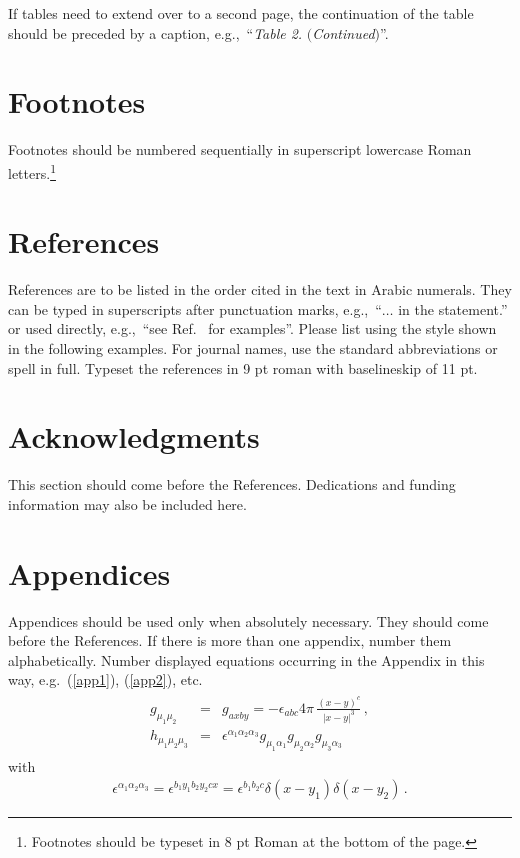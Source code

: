 \documentclass{ws-ijmpc}
\begin{document}
If tables need to extend over to a second page, the continuation of
the table should be preceded by a caption, e.g.,~``{\it Table 2.}
$(${\it Continued}$)$''.

\section{Footnotes}
Footnotes should be numbered sequentially in superscript
lowercase Roman letters.\footnote{Footnotes should be
typeset in 8 pt Roman at the bottom of the page.}

\section{References}
References are to be listed in the order cited in the text in Arabic
numerals.  They can be typed in superscripts after punctuation marks,
e.g.,~``$\ldots$ in the statement.\cite{1,2,3}'' or used directly,
e.g.,~``see Ref.~ for examples''. Please list using the
style shown in the following examples.  For journal names, use the
standard abbreviations or spell in full. Typeset the references in 9 pt
roman with baselineskip of 11 pt.

\section*{Acknowledgments}
This section should come before the References. Dedications and
funding information may also be included here.

\appendix

\section{Appendices}
Appendices should be used only when absolutely necessary. They
should come before the References. If there is more than one
appendix, number them alphabetically. Number displayed equations
occurring in the Appendix in this way, e.g.~(\ref{app1}),\break
(\ref{app2}), etc.
\begin{eqnarray}	%
\begin{array}{rcl}
g_{\mu_1\mu_2} &=& g_{axby}=-\displaystyle{\epsilon_{abc}}{4\pi}\,
\frac{(x-y)^c}{|x-y|^3}\,, \\[8pt]
h_{\mu_1\mu_2\mu_3} &=& \epsilon^{\alpha_1 \alpha_2 \alpha_3}
g_{\mu_1\alpha_1}g_{\mu_2\alpha_2}g_{\mu_3\alpha_3}
\end{array}
\label{app1}
\end{eqnarray}
with
\begin{eqnarray}	%
\epsilon^{\alpha_1 \alpha_2 \alpha_3} = \epsilon^{b_1y_1b_2y_2cx} =
\epsilon^{b_1b_2c}\delta(x-y_1)\delta(x-y_2)\,.
\label{app2}
\end{eqnarray}
\end{document}
